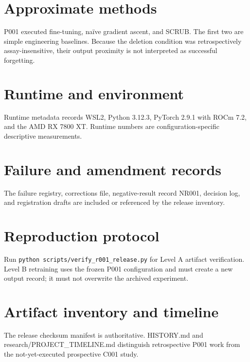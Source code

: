 \documentclass[10pt]{article}
\begin{document}
\section{Approximate methods}
P001 executed fine-tuning, naïve gradient ascent, and SCRUB. The first two are simple
engineering baselines. Because the deletion condition was retrospectively assay-insensitive,
their output proximity is not interpreted as successful forgetting.
\section{Runtime and environment}
Runtime metadata records WSL2, Python 3.12.3, PyTorch 2.9.1 with ROCm 7.2, and the AMD RX
7800 XT. Runtime numbers are configuration-specific descriptive measurements.
\section{Failure and amendment records}
The failure registry, corrections file, negative-result record NR001, decision log, and
registration drafts are included or referenced by the release inventory.
\section{Reproduction protocol}
Run \texttt{python scripts/verify\_r001\_release.py} for Level A artifact verification.
Level B retraining uses the frozen P001 configuration and must create a new output record;
it must not overwrite the archived experiment.
\section{Artifact inventory and timeline}
The release checksum manifest is authoritative. HISTORY.md and research/PROJECT\_TIMELINE.md
distinguish retrospective P001 work from the not-yet-executed prospective C001 study.
\end{document}
